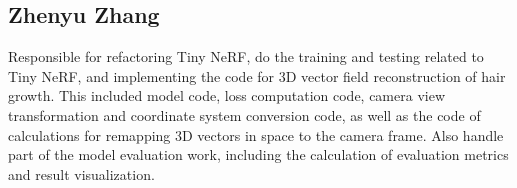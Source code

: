 \documentclass{article}
\begin{document}
\subsection{Zhenyu Zhang}

Responsible for refactoring Tiny NeRF, do the training and testing related to Tiny NeRF, and implementing the code for 3D vector field reconstruction of hair growth. This included model code, loss computation code, camera view transformation and coordinate system conversion code, as well as the code of calculations for remapping 3D vectors in space to the camera frame. Also handle part of the model evaluation work, including the calculation of evaluation metrics and result visualization.
\end{document}

